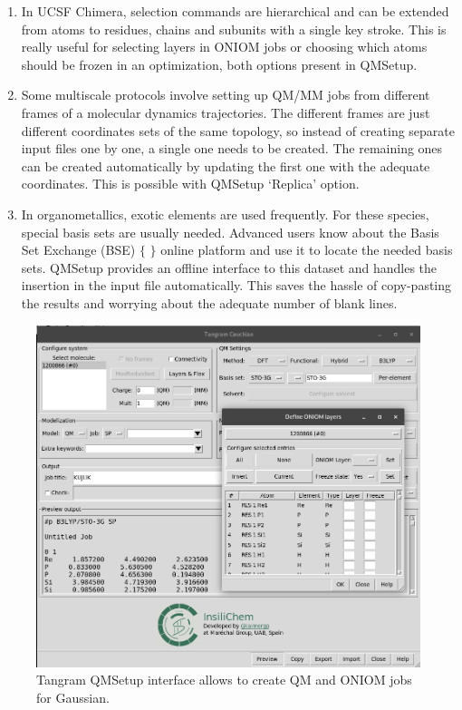 \begin{enumerate}
	\item In UCSF Chimera, selection commands are hierarchical and can be extended from atoms to residues, chains and subunits with a single key stroke. This is really useful for selecting layers in ONIOM jobs or choosing which atoms should be frozen in an optimization, both options present in QMSetup.

	\item Some multiscale protocols involve setting up QM/MM jobs from different frames of a molecular dynamics trajectories. The different frames are just different coordinates sets of the same topology, so instead of creating separate input files one by one, a single one needs to be created. The remaining ones can be created automatically by updating the first one with the adequate coordinates. This is possible with QMSetup ‘Replica’ option.

	\item In organometallics, exotic elements are used frequently. For these species, special basis sets are usually needed. Advanced users know about the Basis Set Exchange (BSE) $ \{ $ $ \} $  online platform and use it to locate the needed basis sets. QMSetup provides an offline interface to this dataset and handles the insertion in the input file automatically. This saves the hassle of copy-pasting the results and worrying about the adequate number of blank lines.
\end{enumerate}





\begin{figure}[H] %
	\begin{Center}
		\includegraphics[width=\textwidth]{./figures/05/tangram_qm.png}
	\end{Center}
	\caption[Tangram QMSetup]{Tangram QMSetup interface allows to create QM and ONIOM jobs for Gaussian.}
	\label{fig:tangram-qmsetup}
\end{figure}


